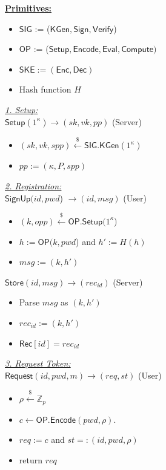 \documentclass[conference]{IEEEtran}
\newcommand{\secparameter}{\kappa}
\newcommand{\pwd}{pwd}
\newcommand{\sk}{sk}
\newcommand{\vk}{vk}
\newcommand{\pp}{pp}
\newcommand{\uid}{id}
\def\mg{\color{magenta}}
\begin{document}
\begin{figure}
\begin{multicols}{2} \raggedcolumns
\scriptsize
\underline{{\bf Primitives:}}
\begin{itemize}
    \item %
    $\mathsf{SIG}$ := ($\mathsf{KGen}, \mathsf{Sign}, \mathsf{Verify}$)
    \item %
    $\mathsf{OP}$ := ($\mathsf{Setup}, \mathsf{Encode}, \mathsf{Eval}, \mathsf{Compute})$
    \item %
    $\mathsf{SKE} := (\mathsf{Enc}, \mathsf{Dec})$
    \item Hash function $H$
\end{itemize}

\vspace{3mm}
\underline{{\em1. Setup:}}\\
$\mathsf{Setup}(1^{\secparameter}) \rightarrow (\sk, \vk, \pp)$ \hspace*{\fill} (Server) 
\begin{itemize}
    \item $(\sk,\vk, spp) \xleftarrow{\$} \mathsf{SIG.KGen}(1^{\secparameter})$ 
    \item $\pp := (\secparameter, P, spp)$ 
\end{itemize}
\underline{{\em2. Registration:}}\\
$\mathsf{SignUp}(\uid, \pwd$) $\rightarrow (\uid,msg)$ \hspace*{\fill} (User)
\begin{itemize}
    \item  $(k,opp) \xleftarrow{\$} \mathsf{OP.Setup}(1^{\secparameter}$) 
    \item  $h := \mathsf{OP}(k,\pwd$) and $h' := H(h)$
    \item  $msg := (k,h')$ %
\end{itemize}

$\mathsf{Store}(\uid, msg) \rightarrow (rec_{\uid})$ \hspace*{\fill} (Server)
\begin{itemize}
    \item Parse $msg$ as $(k,h')$
    \item $rec_{\uid} := (k,h')$
    \item $\mathsf{Rec}[\uid] = rec_{\uid}$
\end{itemize}

\columnbreak
\underline{{\em3. Request Token:}}\\
$\mathsf{Request}(\uid,\pwd,m) \rightarrow (req,st)$ \hspace*{\fill} (User)
\begin{itemize}
    \item $\rho \xleftarrow{\$} \mathbb{Z}_{p}$
    \item $c \leftarrow \mathsf{OP.Encode}(\pwd, \rho)$.
    \item $req := c$ and $st =: (\uid, \pwd, \rho)$
    \item return $req$
\end{itemize}


\end{multicols}
\end{figure}
\end{document}

